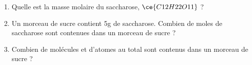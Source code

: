 \documentclass[
  11pt,
  a4paper,
  openany]{book}
\begin{document}
\newpage

\begin{Exercise}

\begin{enumerate}
\def\labelenumi{\arabic{enumi}.}
\item
  Quelle est la masse molaire du saccharose, \(\ce{C12H22O11}\) ?
\item
  Un morceau de sucre contient 5g de saccharose. Combien de moles de saccharose sont contenues dans un morceau de sucre ?
\item
  Combien de molécules et d'atomes au total sont contenus dans un morceau de sucre ?
\end{enumerate}

\end{Exercise}
\end{document}
